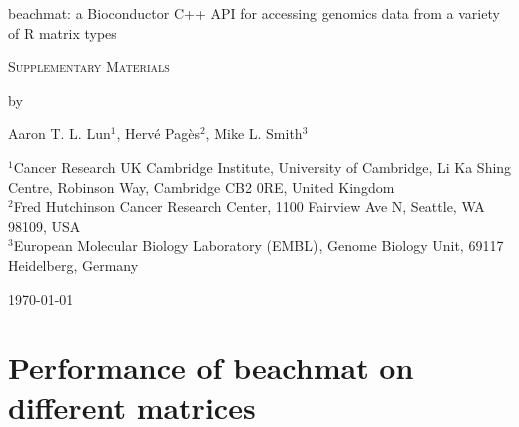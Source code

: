 \documentclass{article}
\begin{document}
\begin{titlepage}
\vspace*{3cm}
\begin{center}


{\LARGE
beachmat: a Bioconductor C++ API for accessing genomics data from a variety of R matrix types
\par}

\vspace{0.75cm}

{\Large
    \textsc{Supplementary Materials}
\par
}
\vspace{0.75cm}

\large
by


\vspace{0.75cm}
Aaron T. L. Lun$^1$,
Herv\'e Pag\`es$^2$,
Mike L. Smith$^3$

\vspace{1cm}
\begin{minipage}{0.9\textwidth}
\begin{flushleft}
$^1$Cancer Research UK Cambridge Institute, University of Cambridge, Li Ka Shing Centre, Robinson Way, Cambridge CB2 0RE, United Kingdom \\[6pt]
$^2$Fred Hutchinson Cancer Research Center, 1100 Fairview Ave N, Seattle, WA 98109, USA \\[6pt]
$^3$European Molecular Biology Laboratory (EMBL), Genome Biology Unit, 69117 Heidelberg, Germany \\[6pt]
\end{flushleft}
\end{minipage}

\vspace{1.5cm}
{\large \today{}}

\vspace*{\fill}
\end{center}
\end{titlepage}

\providecommand{\myceil}[1]{\left \lceil #1 \right \rceil }

\section{Performance of beachmat on different matrices}
\end{document}
